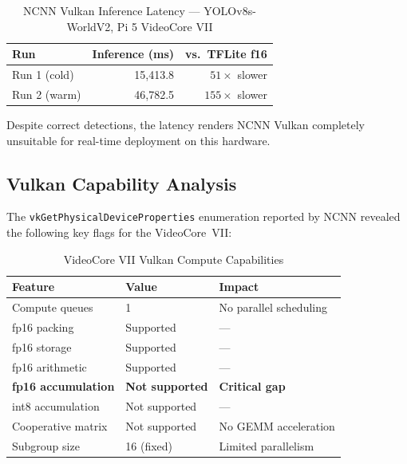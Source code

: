 \documentclass[conference]{IEEEtran}
\begin{document}
\begin{table}[ht]
  \caption{NCNN Vulkan Inference Latency — YOLOv8s-WorldV2, Pi 5 VideoCore VII}
  \label{tab:ncnn}
  \centering
  \begin{tabular}{lrr}
    \toprule
    \textbf{Run} & \textbf{Inference (ms)} & \textbf{vs.\ TFLite f16} \\
    \midrule
    Run 1 (cold) & 15,413.8 & $51\times$ slower \\
    Run 2 (warm) & 46,782.5 & $155\times$ slower \\
    \bottomrule
  \end{tabular}
\end{table}

Despite correct detections, the latency renders NCNN Vulkan completely
unsuitable for real-time deployment on this hardware.

\subsection{Vulkan Capability Analysis}

The \texttt{vkGetPhysicalDeviceProperties} enumeration reported by NCNN
revealed the following key flags for the VideoCore~VII:

\begin{table}[ht]
  \caption{VideoCore VII Vulkan Compute Capabilities}
  \label{tab:vulkan}
  \centering
  \begin{tabular}{lll}
    \toprule
    \textbf{Feature} & \textbf{Value} & \textbf{Impact} \\
    \midrule
    Compute queues     & 1             & No parallel scheduling \\
    fp16 packing       & Supported     & --- \\
    fp16 storage       & Supported     & --- \\
    fp16 arithmetic    & Supported     & --- \\
    \textbf{fp16 accumulation} & \textbf{Not supported} & \textbf{Critical gap} \\
    int8 accumulation  & Not supported & --- \\
    Cooperative matrix & Not supported & No GEMM acceleration \\
    Subgroup size      & 16 (fixed)    & Limited parallelism \\
    \bottomrule
  \end{tabular}
\end{table}

\end{document}
